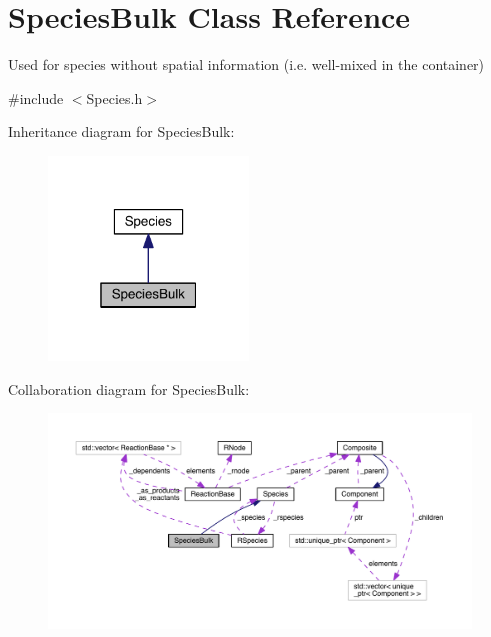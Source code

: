 \hypertarget{classSpeciesBulk}{\section{Species\+Bulk Class Reference}
\label{classSpeciesBulk}
}


Used for species without spatial information (i.\+e. well-\/mixed in the container)  




{\ttfamily \#include $<$Species.\+h$>$}



Inheritance diagram for Species\+Bulk\+:\nopagebreak
\begin{figure}[H]
\begin{center}
\leavevmode
\includegraphics[width=151pt]{classSpeciesBulk__inherit__graph}
\end{center}
\end{figure}


Collaboration diagram for Species\+Bulk\+:
\nopagebreak
\begin{figure}[H]
\begin{center}
\leavevmode
\includegraphics[width=350pt]{classSpeciesBulk__coll__graph}
\end{center}
\end{figure}
